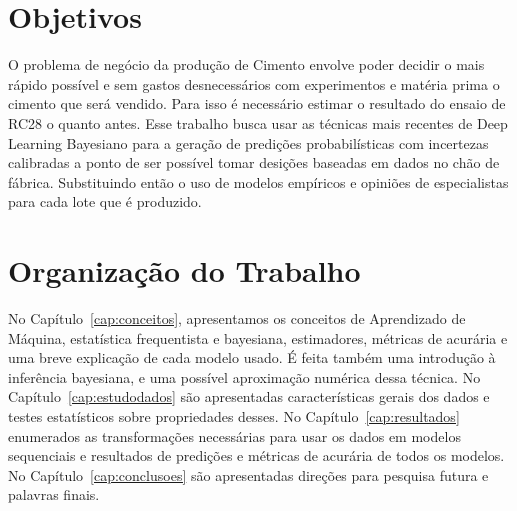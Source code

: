 \section{Objetivos}
\label{sec:objetivo}

O problema de negócio da produção de Cimento envolve poder decidir o mais rápido
possível e sem gastos desnecessários com experimentos e matéria prima o cimento
que será vendido. Para isso é necessário estimar o resultado do ensaio de RC28 o
quanto antes. Esse trabalho busca usar as técnicas mais recentes de Deep
Learning Bayesiano para a geração de predições probabilísticas com incertezas
calibradas a ponto de ser possível tomar desições baseadas em dados no chão de
fábrica. Substituindo então o uso de modelos empíricos e opiniões de
especialistas para cada lote que é produzido.


\section{Organização do Trabalho}
\label{sec:organizacao_trabalho}

No Capítulo~\ref{cap:conceitos}, apresentamos os conceitos de Aprendizado de
Máquina, estatística frequentista e bayesiana, estimadores, métricas de acurária
e uma breve explicação de cada modelo usado. É feita também uma introdução à inferência
bayesiana, e uma possível aproximação numérica dessa técnica. No
Capítulo~\ref{cap:estudodados} são apresentadas características gerais dos
dados e testes estatísticos sobre propriedades desses. No
Capítulo~\ref{cap:resultados} enumerados as transformações necessárias para usar
os dados em modelos sequenciais e resultados de predições e métricas de
acurária de todos os modelos. No Capítulo~\ref{cap:conclusoes} são apresentadas
direções para pesquisa futura e palavras finais. 



